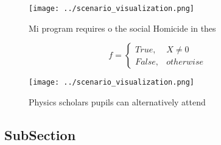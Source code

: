 \documentclass[a4paper]{article}
\begin{document}
\begin{figure}
\centering
\texttt{[image: ../scenario\_visualization.png]}
\caption{Mi program requires o the social Homicide in thes
}
\end{figure}
 
\begin{equation}   f =
\begin{cases} True, & X \neq 0\\
False, & otherwise
\end{cases}
\end{equation}

\begin{figure}
\centering
\texttt{[image: ../scenario\_visualization.png]}
\caption{Physics scholars pupils can alternatively attend 
}
\end{figure}
 
\subsection{SubSection}
\end{document}
